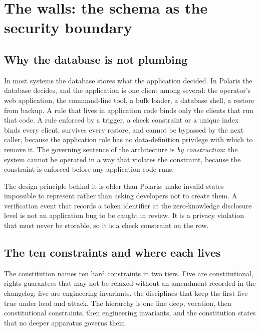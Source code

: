 \section{The walls: the schema as the security boundary}
\label{sec:walls}



\subsection{Why the database is not plumbing}

In most systems the database stores what the application decided. In Polaris the database decides,
and the application is one client among several: the operator's web application, the command-line
tool, a bulk loader, a database shell, a restore from backup. A rule that lives in application code
binds only the clients that run that code. A rule enforced by a trigger, a check constraint or a
unique index binds every client, survives every restore, and cannot be bypassed by the next caller,
because the application role has no data-definition privilege with which to remove it. The
governing sentence of the architecture is \emph{by construction}: the system cannot be operated in a
way that violates the constraint, because the constraint is enforced before any application code
runs. \sImpl

The design principle behind it is older than Polaris: make invalid states impossible to represent
rather than asking developers not to create them. A verification event that records a token
identifier at the zero-knowledge disclosure level is not an application bug to be caught in review.
It is a privacy violation that must never be storable, so it is a check constraint on the row.

\subsection{The ten constraints and where each lives}

The constitution names ten hard constraints in two tiers. Five are constitutional, rights
guarantees that may not be relaxed without an amendment recorded in the changelog; five are
engineering invariants, the disciplines that keep the first five true under load and attack. The
hierarchy is one line deep, vocation, then constitutional constraints, then engineering invariants,
and the constitution states that no deeper apparatus governs them.

